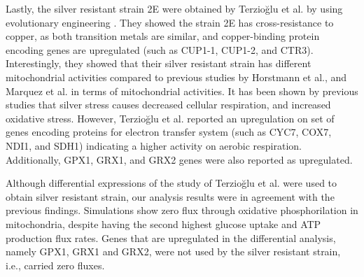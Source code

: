 Lastly, the silver resistant strain 2E were obtained by Terzioğlu et al. by using evolutionary engineering \cite{terziouglu2020genomic}. They showed the strain 2E has cross-resistance to copper, as both transition metals are similar, and copper-binding protein encoding genes are upregulated (such as CUP1-1, CUP1-2, and CTR3). Interestingly, they showed that their silver resistant strain has different mitochondrial activities compared to previous studies by Horstmann et al.\cite{horstmann2019transcriptome}, and Marquez et al. \cite{galvan2018zinc} in terms of mitochondrial activities. It has been shown by previous studies that silver stress causes decreased cellular respiration, and increased oxidative stress. However, Terzioğlu et al. reported an upregulation on set of genes encoding proteins for electron transfer system (such as CYC7, COX7, NDI1, and SDH1) indicating a higher activity on aerobic respiration. Additionally, GPX1, GRX1, and GRX2 genes were also reported as upregulated.

Although differential expressions of the study of Terzioğlu et al. were used to obtain silver resistant strain, our analysis results were in agreement with the previous findings. Simulations show zero flux through oxidative phosphorilation in mitochondria, despite having the second highest glucose uptake and ATP production flux rates. Genes that are upregulated in the differential analysis, namely GPX1, GRX1 and GRX2, were not used by the silver resistant strain, i.e., carried zero fluxes.
